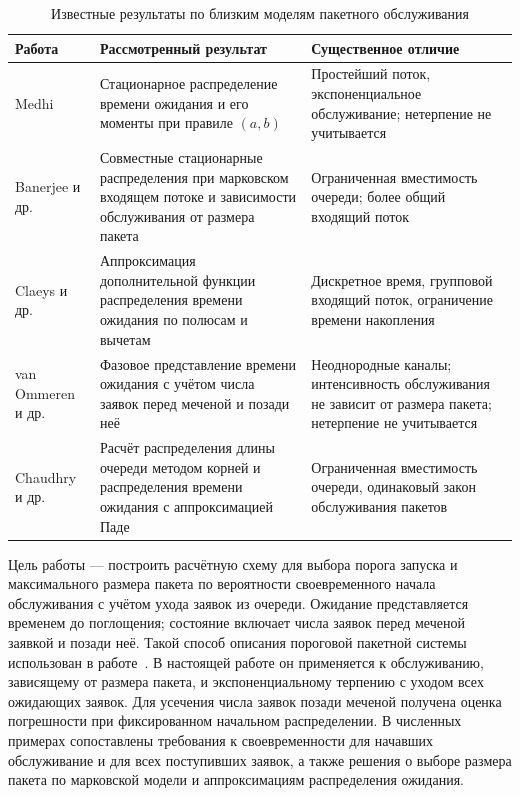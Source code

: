 \begin{table}[htbp]
\centering\small
\caption{Известные результаты по близким моделям пакетного обслуживания}\label{tab:prior}
\begin{tabular}{p{.22\linewidth}p{.36\linewidth}p{.34\linewidth}}
\hline
Работа & Рассмотренный результат & Существенное отличие \\\hline
Medhi~\cite{medhi1975} & Стационарное распределение времени ожидания и его моменты при правиле $(a,b)$ & Простейший поток, экспоненциальное обслуживание; нетерпение не учитывается \\
Banerjee и др.~\cite{banerjee2015} & Совместные стационарные распределения при марковском входящем потоке и зависимости обслуживания от размера пакета & Ограниченная вместимость очереди; более общий входящий поток \\
Claeys и др.~\cite{claeys2013} & Аппроксимация дополнительной функции распределения времени ожидания по полюсам и вычетам & Дискретное время, групповой входящий поток, ограничение времени накопления \\
van Ommeren и др.~\cite{vanommer2020} & Фазовое представление времени ожидания с учётом числа заявок перед меченой и позади неё & Неоднородные каналы; интенсивность обслуживания не зависит от размера пакета; нетерпение не учитывается \\
Chaudhry и др.~\cite{chaudhry2023} & Расчёт распределения длины очереди методом корней и распределения времени ожидания с аппроксимацией Паде & Ограниченная вместимость очереди, одинаковый закон обслуживания пакетов \\
\hline
\end{tabular}
\end{table}

Цель работы --- построить расчётную схему для выбора порога запуска и максимального размера пакета по вероятности своевременного начала обслуживания с учётом ухода заявок из очереди. Ожидание представляется временем до поглощения; состояние включает числа заявок перед меченой заявкой и позади неё. Такой способ описания пороговой пакетной системы использован в работе~\cite{vanommer2020}. В настоящей работе он применяется к обслуживанию, зависящему от размера пакета, и экспоненциальному терпению с уходом всех ожидающих заявок. Для усечения числа заявок позади меченой получена оценка погрешности при фиксированном начальном распределении. В численных примерах сопоставлены требования к своевременности для начавших обслуживание и для всех поступивших заявок, а также решения о выборе размера пакета по марковской модели и аппроксимациям распределения ожидания.

